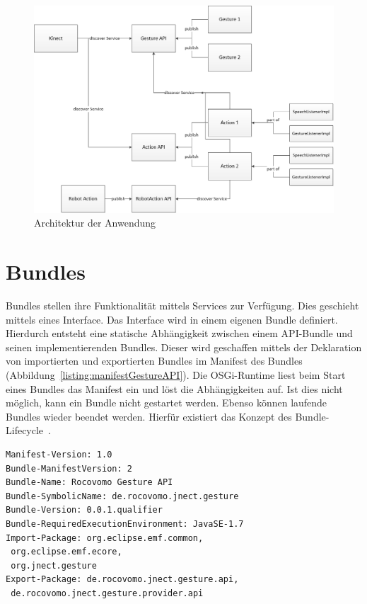 \begin{figure}[htb]
\centering
\includegraphics[width=1\textwidth]{img/09kapitel/osgi-architecture.png}
\caption[Anwendungsarchitektur]{Architektur der Anwendung}
\label{fig:osgiArchitecture}
\end{figure}

\section{Bundles}
\label{sec:osgiBundles}

Bundles stellen ihre Funktionalit\"at mittels Services zur Verf\"ugung. Dies geschieht mittels eines Interface. 
Das Interface wird in einem eigenen Bundle definiert. Hierdurch entsteht eine statische Abh\"angigkeit 
zwischen einem API-Bundle und seinen implementierenden Bundles. Dieser wird geschaffen mittels der Deklaration von importierten 
und exportierten Bundles im Manifest des Bundles (Abbildung~\ref{listing:manifestGestureAPI}). Die OSGi-Runtime liest beim Start 
eines Bundles das Manifest ein und l\"ost die Abh\"angigkeiten auf. Ist dies nicht m\"oglich, kann ein Bundle nicht gestartet werden. 
Ebenso k\"onnen laufende Bundles wieder beendet werden. Hierf\"ur existiert das Konzept des Bundle-Lifecycle~\footnotemark[3].

\newpage
\par\smallskip
\lstset{language=Java}
\begin{lstlisting}[caption={Manifest der Gesture API}, label={listing:manifestGestureAPI}]
Manifest-Version: 1.0
Bundle-ManifestVersion: 2
Bundle-Name: Rocovomo Gesture API
Bundle-SymbolicName: de.rocovomo.jnect.gesture
Bundle-Version: 0.0.1.qualifier
Bundle-RequiredExecutionEnvironment: JavaSE-1.7
Import-Package: org.eclipse.emf.common,
 org.eclipse.emf.ecore,
 org.jnect.gesture
Export-Package: de.rocovomo.jnect.gesture.api,
 de.rocovomo.jnect.gesture.provider.api
\end{lstlisting}
\par\smallskip

